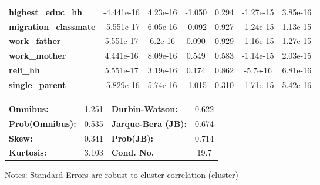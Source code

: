 \begin{center}
\begin{tabular}{lcccccc}
\textbf{highest\_educ\_hh}    &   -4.441e-16  &     4.23e-16     &    -1.050  &         0.294        &    -1.27e-15    &     3.85e-16     \\
\textbf{migration\_classmate} &   -5.551e-17  &     6.05e-16     &    -0.092  &         0.927        &    -1.24e-15    &     1.13e-15     \\
\textbf{work\_father}         &    5.551e-17  &      6.2e-16     &     0.090  &         0.929        &    -1.16e-15    &     1.27e-15     \\
\textbf{work\_mother}         &    4.441e-16  &     8.09e-16     &     0.549  &         0.583        &    -1.14e-15    &     2.03e-15     \\
\textbf{reli\_hh}             &    5.551e-17  &     3.19e-16     &     0.174  &         0.862        &     -5.7e-16    &     6.81e-16     \\
\textbf{single\_parent}       &   -5.829e-16  &     5.74e-16     &    -1.015  &         0.310        &    -1.71e-15    &     5.42e-16     \\
\bottomrule
\end{tabular}
\begin{tabular}{lclc}
\textbf{Omnibus:}       &  1.251 & \textbf{  Durbin-Watson:     } &    0.622  \\
\textbf{Prob(Omnibus):} &  0.535 & \textbf{  Jarque-Bera (JB):  } &    0.674  \\
\textbf{Skew:}          &  0.341 & \textbf{  Prob(JB):          } &    0.714  \\
\textbf{Kurtosis:}      &  3.103 & \textbf{  Cond. No.          } &     19.7  \\
\bottomrule
\end{tabular}
\end{center}

Notes: \newline
 [1] Standard Errors are robust to cluster correlation (cluster)